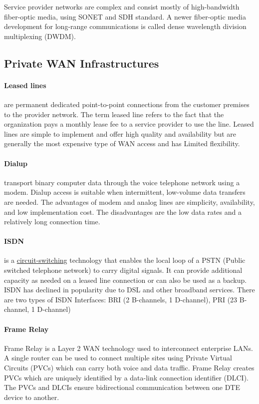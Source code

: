 Service provider networks are complex and consist mostly of high-bandwidth fiber-optic media, using SONET and SDH standard. A newer fiber-optic media development for long-range communications is called dense wavelength division multiplexing (DWDM).

\subsection{Private WAN Infrastructures}

\paragraph{Leased lines} are permanent dedicated point-to-point connections from the customer premises to the provider network. The term leased line refers to the fact that the organization pays a monthly lease fee to a service provider to use the line. Leased lines are simple to implement and offer high quality and availability but are generally the most expensive type of WAN access and has Limited flexibility.

\paragraph{Dialup}transport binary computer data through the voice telephone network using a modem. Dialup access is suitable when intermittent, low-volume data transfers are needed. The advantages of modem and analog lines are simplicity, availability, and low implementation cost. The disadvantages are the low data rates and a relatively long connection time. 

\paragraph{ISDN}is a \underline{circuit-switching} technology that enables the local loop of a PSTN (Public switched telephone network) to carry digital signals. It can provide additional capacity as needed on a leased line connection or can also be used as a backup. ISDN has declined in popularity due to DSL and other broadband services. There are two types of ISDN Interfaces: BRI (2 B-channels, 1 D-channel), PRI (23 B-channel, 1 D-channel)

\paragraph{Frame Relay}Frame Relay is a Layer 2 WAN technology used to interconnect enterprise LANs. A single router can be used to connect multiple sites using Private Virtual Circuits (PVCs) which can carry both voice and data traffic. Frame Relay creates PVCs which are uniquely identified by a data-link connection identifier (DLCI). The PVCs and DLCIs ensure bidirectional communication between one DTE device to another.

